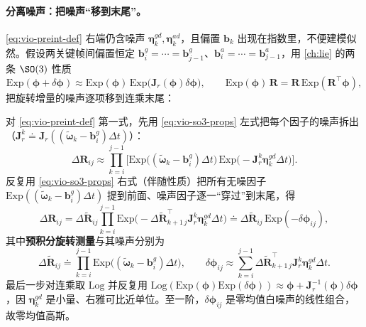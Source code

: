 \paragraph{分离噪声：把噪声“移到末尾”。}
\cref{eq:vio-preint-def} 右端仍含噪声 $\boldsymbol{\eta}^{gd}_k,\boldsymbol{\eta}^{ad}_k$，且偏置 $\mathbf{b}_k$ 出现在指数里，不便建模似然。假设两关键帧间偏置恒定 $\mathbf{b}^g_i=\cdots=\mathbf{b}^g_{j-1}$、$\mathbf{b}^a_i=\cdots=\mathbf{b}^a_{j-1}$，用 \cref{ch:lie} 的两条 $\SO(3)$ 性质
\begin{equation}
  \mathrm{Exp}(\boldsymbol{\phi}+\delta\boldsymbol{\phi})\approx\mathrm{Exp}(\boldsymbol{\phi})\,\mathrm{Exp}\!\big(\mathbf{J}_r(\boldsymbol{\phi})\delta\boldsymbol{\phi}\big),
  \qquad
  \mathrm{Exp}(\boldsymbol{\phi})\,\mathbf{R}=\mathbf{R}\,\mathrm{Exp}(\mathbf{R}^\top\boldsymbol{\phi}),
  \label{eq:vio-so3-props}
\end{equation}
把旋转增量的噪声逐项移到连乘末尾：

\begin{derivation}[旋转增量的噪声分离]
对 \cref{eq:vio-preint-def} 第一式，先用 \cref{eq:vio-so3-props} 左式把每个因子的噪声拆出（$\mathbf{J}_r^k\doteq\mathbf{J}_r((\tilde{\boldsymbol{\omega}}_k-\mathbf{b}^g_i)\Delta t)$）：
\[
  \Delta\mathbf{R}_{ij}\approx\prod_{k=i}^{j-1}\Big[\mathrm{Exp}\!\big((\tilde{\boldsymbol{\omega}}_k-\mathbf{b}^g_i)\Delta t\big)\,\mathrm{Exp}\!\big(-\mathbf{J}_r^k\boldsymbol{\eta}^{gd}_k\Delta t\big)\Big].
\]
反复用 \cref{eq:vio-so3-props} 右式（伴随性质）把所有无噪因子 $\mathrm{Exp}((\tilde{\boldsymbol{\omega}}_k-\mathbf{b}^g_i)\Delta t)$ 提到前面、噪声因子逐一“穿过”到末尾，得
\[
  \Delta\mathbf{R}_{ij}=\Delta\tilde{\mathbf{R}}_{ij}\prod_{k=i}^{j-1}\mathrm{Exp}\!\big(-\Delta\tilde{\mathbf{R}}_{k+1\,j}^\top\mathbf{J}_r^k\boldsymbol{\eta}^{gd}_k\Delta t\big)
  \doteq\Delta\tilde{\mathbf{R}}_{ij}\,\mathrm{Exp}(-\delta\boldsymbol{\phi}_{ij}),
\]
其中\textbf{预积分旋转测量}与其噪声分别为
\begin{equation}
  \Delta\tilde{\mathbf{R}}_{ij}\doteq\prod_{k=i}^{j-1}\mathrm{Exp}\!\big((\tilde{\boldsymbol{\omega}}_k-\mathbf{b}^g_i)\Delta t\big),
  \qquad
  \delta\boldsymbol{\phi}_{ij}\approx\sum_{k=i}^{j-1}\Delta\tilde{\mathbf{R}}_{k+1\,j}^\top\mathbf{J}_r^k\boldsymbol{\eta}^{gd}_k\Delta t.
  \label{eq:vio-dR-noise}
\end{equation}
最后一步对连乘取 $\mathrm{Log}$ 并反复用 $\mathrm{Log}(\mathrm{Exp}(\boldsymbol{\phi})\mathrm{Exp}(\delta\boldsymbol{\phi}))\approx\boldsymbol{\phi}+\mathbf{J}_r^{-1}(\boldsymbol{\phi})\delta\boldsymbol{\phi}$，因 $\boldsymbol{\eta}^{gd}_k$ 是小量、右雅可比近单位。至一阶，$\delta\boldsymbol{\phi}_{ij}$ 是零均值白噪声的线性组合，故零均值高斯。
\end{derivation}


